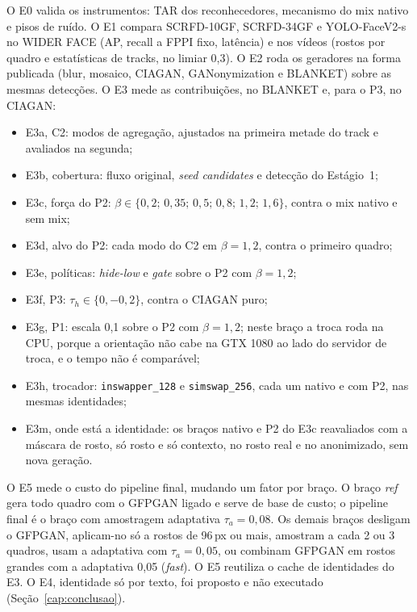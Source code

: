 O E0 valida os instrumentos: TAR dos reconhecedores, mecanismo do mix nativo e pisos de ruído. O E1 compara SCRFD-10GF, SCRFD-34GF e YOLO-FaceV2-s no WIDER FACE (AP, recall a FPPI fixo, latência) e nos vídeos (rostos por quadro e estatísticas de tracks, no limiar 0,3). O E2 roda os geradores na forma publicada (blur, mosaico, CIAGAN, GANonymization e BLANKET) sobre as mesmas detecções. O E3 mede as contribuições, no BLANKET e, para o P3, no CIAGAN:
\begin{itemize}
\item E3a, C2: modos de agregação, ajustados na primeira metade do track e avaliados na segunda;
\item E3b, cobertura: fluxo original, \emph{seed candidates} e detecção do Estágio~1;
\item E3c, força do P2: $\beta \in \{0{,}2;\, 0{,}35;\, 0{,}5;\, 0{,}8;\, 1{,}2;\, 1{,}6\}$, contra o mix nativo e sem mix;
\item E3d, alvo do P2: cada modo do C2 em $\beta = 1{,}2$, contra o primeiro quadro;
\item E3e, políticas: \emph{hide-low} e \emph{gate} sobre o P2 com $\beta = 1{,}2$;
\item E3f, P3: $\tau_h \in \{0, -0{,}2\}$, contra o CIAGAN puro;
\item E3g, P1: escala 0,1 sobre o P2 com $\beta = 1{,}2$; neste braço a troca roda na CPU, porque a orientação não cabe na GTX 1080 ao lado do servidor de troca, e o tempo não é comparável;
\item E3h, trocador: \texttt{inswapper\_128} e \texttt{simswap\_256}, cada um nativo e com P2, nas mesmas identidades;
\item E3m, onde está a identidade: os braços nativo e P2 do E3c reavaliados com a máscara de rosto, só rosto e só contexto, no rosto real e no anonimizado, sem nova geração.
\end{itemize}

O E5 mede o custo do pipeline final, mudando um fator por braço. O braço \emph{ref} gera todo quadro com o GFPGAN ligado e serve de base de custo; o pipeline final é o braço com amostragem adaptativa $\tau_a = 0{,}08$. Os demais braços desligam o GFPGAN, aplicam-no só a rostos de 96\,px ou mais, amostram a cada 2 ou 3 quadros, usam a adaptativa com $\tau_a = 0{,}05$, ou combinam GFPGAN em rostos grandes com a adaptativa 0,05 (\emph{fast}). O E5 reutiliza o cache de identidades do E3. O E4, identidade só por texto, foi proposto e não executado (Seção~\ref{cap:conclusao}).
